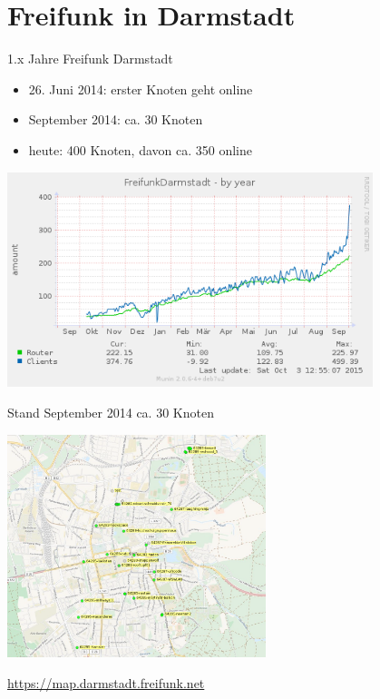 \documentclass[10pt]{beamer}
\begin{document}
  \section{Freifunk in Darmstadt}

    \begin{frame}{1.x Jahre Freifunk Darmstadt}
      \vfill
      \begin{itemize}
        \item 26. Juni 2014: erster Knoten geht online
        \pause \item September 2014: ca. 30 Knoten
        \pause \item heute: 400 Knoten, davon ca. 350 online

      \end{itemize}
      \pause
      \begin{center}
        \includegraphics[width=0.8\textwidth]{images/ffda-Okt14-15}
      \end{center}
    \end{frame}

    \begin{frame}{Stand September 2014}
      ca. 30 Knoten
      \begin{center}
        \vfill
        \begin{center}
          \includegraphics[height=6.5cm]{images/darmstadt-map}
        \end{center}
        \vfill
        \url{https://map.darmstadt.freifunk.net}
      \end{center}
    \end{frame}
\end{document}
